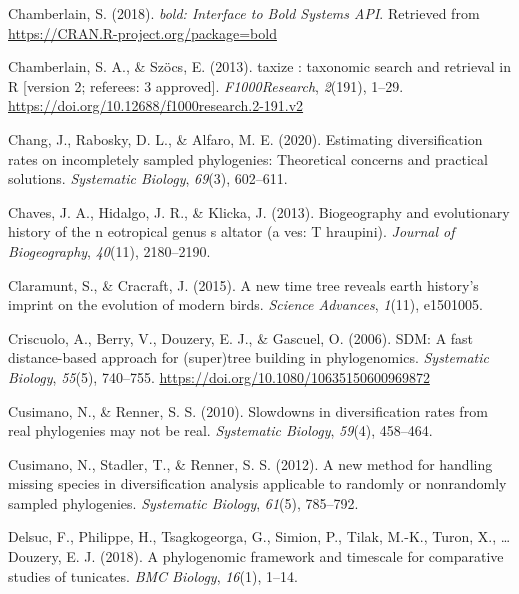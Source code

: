 \documentclass[english,man]{apa6}
\begin{document}
\leavevmode\hypertarget{ref-Chamberlain2018}{}%
Chamberlain, S. (2018). \emph{bold: Interface to Bold Systems API}. Retrieved from \url{https://CRAN.R-project.org/package=bold}

\leavevmode\hypertarget{ref-Chamberlain2013}{}%
Chamberlain, S. A., \& Szöcs, E. (2013). taxize : taxonomic search and retrieval in R {[}version 2; referees: 3 approved{]}. \emph{F1000Research}, \emph{2}(191), 1--29. \url{https://doi.org/10.12688/f1000research.2-191.v2}

\leavevmode\hypertarget{ref-chang2020estimating}{}%
Chang, J., Rabosky, D. L., \& Alfaro, M. E. (2020). Estimating diversification rates on incompletely sampled phylogenies: Theoretical concerns and practical solutions. \emph{Systematic Biology}, \emph{69}(3), 602--611.

\leavevmode\hypertarget{ref-chaves2013biogeography}{}%
Chaves, J. A., Hidalgo, J. R., \& Klicka, J. (2013). Biogeography and evolutionary history of the n eotropical genus s altator (a ves: T hraupini). \emph{Journal of Biogeography}, \emph{40}(11), 2180--2190.

\leavevmode\hypertarget{ref-claramunt2015new}{}%
Claramunt, S., \& Cracraft, J. (2015). A new time tree reveals earth history's imprint on the evolution of modern birds. \emph{Science Advances}, \emph{1}(11), e1501005.

\leavevmode\hypertarget{ref-Criscuolo2006}{}%
Criscuolo, A., Berry, V., Douzery, E. J., \& Gascuel, O. (2006). SDM: A fast distance-based approach for (super)tree building in phylogenomics. \emph{Systematic Biology}, \emph{55}(5), 740--755. \url{https://doi.org/10.1080/10635150600969872}

\leavevmode\hypertarget{ref-cusimano2010slowdowns}{}%
Cusimano, N., \& Renner, S. S. (2010). Slowdowns in diversification rates from real phylogenies may not be real. \emph{Systematic Biology}, \emph{59}(4), 458--464.

\leavevmode\hypertarget{ref-cusimano2012new}{}%
Cusimano, N., Stadler, T., \& Renner, S. S. (2012). A new method for handling missing species in diversification analysis applicable to randomly or nonrandomly sampled phylogenies. \emph{Systematic Biology}, \emph{61}(5), 785--792.

\leavevmode\hypertarget{ref-delsuc2018phylogenomic}{}%
Delsuc, F., Philippe, H., Tsagkogeorga, G., Simion, P., Tilak, M.-K., Turon, X., \ldots{} Douzery, E. J. (2018). A phylogenomic framework and timescale for comparative studies of tunicates. \emph{BMC Biology}, \emph{16}(1), 1--14.
\end{document}
